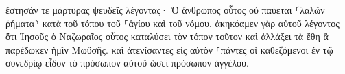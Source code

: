 \documentclass{openreader}
\begin{document}
ἔστησάν τε μάρτυρας ψευδεῖς λέγοντας· Ὁ ἄνθρωπος οὗτος οὐ παύεται ⸂λαλῶν ῥήματα⸃ κατὰ τοῦ τόπου τοῦ ⸀ἁγίου καὶ τοῦ νόμου, 
ἀκηκόαμεν γὰρ αὐτοῦ λέγοντος ὅτι Ἰησοῦς ὁ Ναζωραῖος οὗτος καταλύσει τὸν τόπον τοῦτον καὶ ἀλλάξει τὰ ἔθη ἃ παρέδωκεν ἡμῖν Μωϋσῆς. 
καὶ ἀτενίσαντες εἰς αὐτὸν ⸀πάντες οἱ καθεζόμενοι ἐν τῷ συνεδρίῳ εἶδον τὸ πρόσωπον αὐτοῦ ὡσεὶ πρόσωπον ἀγγέλου. 
\end{document}
